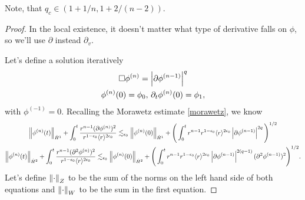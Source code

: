 \documentclass[11pt, oneside]{amsart}
\begin{document}
	Note, that $q_c\in (1+1/n,1+2/(n-2))$.
	\begin{proof}
	In the local existence, it doesn't matter what type of derivative falls on $\phi$, so we'll use $\partial$ instead $\partial_v$.
	
	Let's define a solution iteratively 
	\begin{equation*}
		\begin{gathered}
			\Box\phi^{(n)}=\left\lvert \partial\phi^{(n-1)}\right\rvert^q\\
			\phi^{(n)}(0)=\phi_0,\,\partial_t\phi^{(n)}(0)=\phi_1,
		\end{gathered}
	\end{equation*}
	with $\phi^{(-1)}=0$. Recalling the Morawetz estimate \cref{morawetz}, we know 
	\begin{equation}\label{local existence iteration}
		\begin{gathered}
			\left\lVert \phi^{(n)}(t)\right\rVert_{\dot{H}^1}+\int_0^t\frac{r^{n-1}(\partial\phi^{(n)})^2}{r^{1-\epsilon_0}\langle r \rangle^{2\epsilon_0}}\lesssim_{\epsilon_0}\left\lVert \phi^{(n)}(0)\right\rVert_{\dot{H}^1}+\Bigg(\int_0^t r^{n-1}r^{1-\epsilon_0}\langle r \rangle^{2\epsilon_0}\left\lvert \partial\phi^{(n-1)}\right\rvert^{2q}\Bigg)^{1/2}\\
			\left\lVert \phi^{(n)}(t)\right\rVert_{\dot{H}^2}+\int_0^t\frac{r^{n-1}(\partial^2\phi^{(n)})^2}{r^{1-\epsilon_0}\langle r \rangle^{2\epsilon_0}}\lesssim_{\epsilon_0}\left\lVert \phi^{(n)}(0)\right\rVert_{\dot{H}^2}+\Bigg(\int_0^t r^{n-1}r^{1-\epsilon_0}\langle r \rangle^{2\epsilon_0}\left\lvert \partial\phi^{(n-1)}\right\rvert^{2(q-1)}(\partial^2\phi^{(n-1)})^2\Bigg)^{1/2}.
		\end{gathered}
	\end{equation}
	Let's define $\left\lVert \cdot\right\rVert_{Z}$ to be the sum of the norms on the left hand side of both equations and $\left\lVert \cdot\right\rVert_W$ to be the sum in the first equation.
	

\end{proof}
\end{document}
